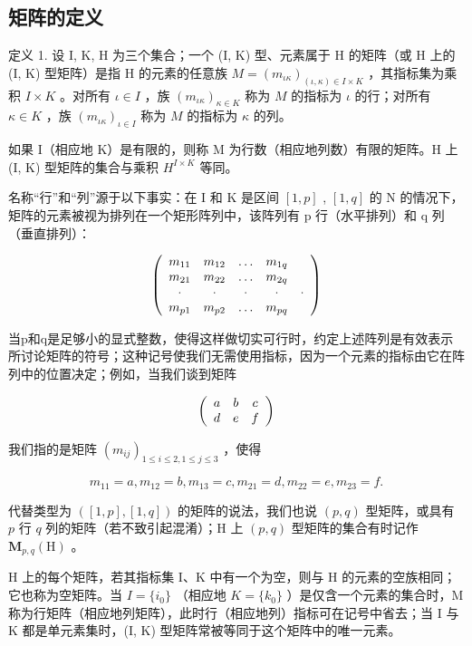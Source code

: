 \subsection{矩阵的定义}

定义 1. 设 I, K, H 为三个集合；一个 (I, K) 型、元素属于 H 的矩阵（或 H 上的 (I, K) 型矩阵）是指 H 的元素的任意族 \(M = (m_{\iota\kappa})_{(\iota, \kappa) \in I \times K}\) ，其指标集为乘积 \(I \times K\) 。对所有 \(\iota \in I\) ，族 \((m_{\iota\kappa})_{\kappa \in K}\) 称为 \(M\) 的指标为 \(\iota\) 的行；对所有 \(\kappa \in K\) ，族 \((m_{\iota\kappa})_{\iota \in I}\) 称为 \(M\) 的指标为 \(\kappa\) 的列。

如果 I（相应地 K）是有限的，则称 M 为行数（相应地列数）有限的矩阵。H 上 (I, K) 型矩阵的集合与乘积 \(H^{I \times K}\) 等同。

名称“行”和“列”源于以下事实：在 I 和 K 是区间 \([1,p]\) , \([1,q]\) 的 N 的情况下，矩阵的元素被视为排列在一个矩形阵列中，该阵列有 p 行（水平排列）和 q 列（垂直排列）：

\[
\left( \begin{array}{c c c c c} m _ {1 1} & m _ {1 2} & \ldots & m _ {1 q} \\ m _ {2 1} & m _ {2 2} & \ldots & m _ {2 q} \\ \cdot & \cdot & \cdot & \cdot & \cdot \\ m _ {p 1} & m _ {p 2} & \ldots & m _ {p q} \end{array} \right)
\]

当p和q是足够小的显式整数，使得这样做切实可行时，约定上述阵列是有效表示所讨论矩阵的符号；这种记号使我们无需使用指标，因为一个元素的指标由它在阵列中的位置决定；例如，当我们谈到矩阵

\[
\left( \begin{array}{c c c} a & b & c \\ d & e & f \end{array} \right)
\]

我们指的是矩阵 \((m_{ij})_{1\leqslant i\leqslant 2,1\leqslant j\leqslant 3}\) ，使得

\[
m _ {1 1} = a, m _ {1 2} = b, m _ {1 3} = c, m _ {2 1} = d, m _ {2 2} = e, m _ {2 3} = f.
\]

代替类型为 \(([1, p], [1, q])\) 的矩阵的说法，我们也说 \((p, q)\) 型矩阵，或具有 \(p\) 行 \(q\) 列的矩阵（若不致引起混淆）；H 上 \((p, q)\) 型矩阵的集合有时记作 \(\mathbf{M}_{p,q}(\mathrm{H})\) 。

H 上的每个矩阵，若其指标集 I、K 中有一个为空，则与 H 的元素的空族相同；它也称为空矩阵。当 \(I = \{i_{0}\}\) （相应地 \(K = \{k_{0}\}\) ）是仅含一个元素的集合时，M 称为行矩阵（相应地列矩阵），此时行（相应地列）指标可在记号中省去；当 I 与 K 都是单元素集时，(I, K) 型矩阵常被等同于这个矩阵中的唯一元素。


